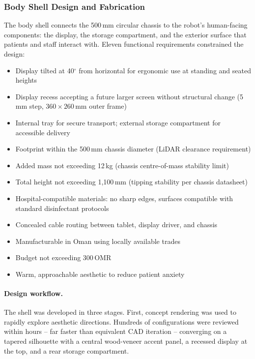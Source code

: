 \subsubsection{Body Shell Design and Fabrication}

The body shell connects the 500\,mm circular chassis to the robot's human-facing components: the display, the storage compartment, and the exterior surface that patients and staff interact with. Eleven functional requirements constrained the design:

\begin{itemize}
  \item Display tilted at 40$^{\circ}$ from horizontal for ergonomic use at standing and seated heights \cite{frontiers2024}
  \item Display recess accepting a future larger screen without structural change (5\,mm step, $360\times260$\,mm outer frame)
  \item Internal tray for secure transport; external storage compartment for accessible delivery
  \item Footprint within the 500\,mm chassis diameter (LiDAR clearance requirement)
  \item Added mass not exceeding 12\,kg (chassis centre-of-mass stability limit)
  \item Total height not exceeding 1{,}100\,mm (tipping stability per chassis datasheet)
  \item Hospital-compatible materials: no sharp edges, surfaces compatible with standard disinfectant protocols \cite{intel2024}
  \item Concealed cable routing between tablet, display driver, and chassis
  \item Manufacturable in Oman using locally available trades
  \item Budget not exceeding 300\,OMR
  \item Warm, approachable aesthetic to reduce patient anxiety \cite{beran2013}
\end{itemize}

\paragraph{Design workflow.}
The shell was developed in three stages. First, concept rendering was used to rapidly explore aesthetic directions. Hundreds of configurations were reviewed within hours -- far faster than equivalent CAD iteration -- converging on a tapered silhouette with a central wood-veneer accent panel, a recessed display at the top, and a rear storage compartment.

